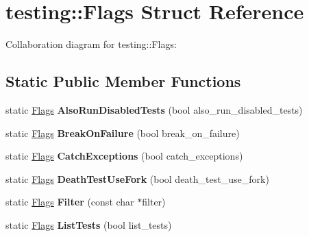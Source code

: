 \hypertarget{structtesting_1_1Flags}{}\section{testing\+:\+:Flags Struct Reference}
\label{structtesting_1_1Flags}


Collaboration diagram for testing\+:\+:Flags\+:
\subsection*{Static Public Member Functions}
\begin{DoxyCompactItemize}
\item 
\mbox{\label{structtesting_1_1Flags_a8bee2b5f94d8248b6791d6b005db146f}} 
static \hyperlink{structtesting_1_1Flags}{Flags} {\bfseries Also\+Run\+Disabled\+Tests} (bool also\+\_\+run\+\_\+disabled\+\_\+tests)
\item 
\mbox{\label{structtesting_1_1Flags_a62660e44922321f7640bc951a04c2296}} 
static \hyperlink{structtesting_1_1Flags}{Flags} {\bfseries Break\+On\+Failure} (bool break\+\_\+on\+\_\+failure)
\item 
\mbox{\label{structtesting_1_1Flags_a2c7d89f62f4328ae0ced66154ef96b44}} 
static \hyperlink{structtesting_1_1Flags}{Flags} {\bfseries Catch\+Exceptions} (bool catch\+\_\+exceptions)
\item 
\mbox{\label{structtesting_1_1Flags_a4468e5625833043596c44be174349d8c}} 
static \hyperlink{structtesting_1_1Flags}{Flags} {\bfseries Death\+Test\+Use\+Fork} (bool death\+\_\+test\+\_\+use\+\_\+fork)
\item 
\mbox{\label{structtesting_1_1Flags_afc7350b7c1ac4c0e0efe2d9a94729eb7}} 
static \hyperlink{structtesting_1_1Flags}{Flags} {\bfseries Filter} (const char $\ast$filter)
\item 
\mbox{\label{structtesting_1_1Flags_a825a5d763a31fe6c28f543990bd336df}} 
static \hyperlink{structtesting_1_1Flags}{Flags} {\bfseries List\+Tests} (bool list\+\_\+tests)
\item 
\mbox{\label{structtesting_1_1Flags_a507916734a6d7ff2dd02891d7849f2d3}} 

\end{DoxyCompactItemize}

